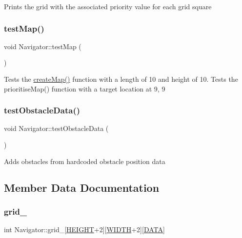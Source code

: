 Prints the grid with the associated priority value for each grid square \mbox{\label{class_navigator_afe98283ec2d1bf0125c63eb077cc1d61}} 
\subsubsection{\texorpdfstring{test\+Map()}{testMap()}}
{\footnotesize\ttfamily void Navigator\+::test\+Map (\begin{DoxyParamCaption}{ }\end{DoxyParamCaption})}

Tests the \mbox{\hyperlink{class_navigator_a8b0cb171e3e3b16b206278fb23f624bc}{create\+Map()}} function with a length of 10 and height of 10. Tests the prioritise\+Map() function with a target location at 9, 9 \mbox{\label{class_navigator_ae31be1ae0d17e7fc78aa7c6a4553fca2}} 
\subsubsection{\texorpdfstring{test\+Obstacle\+Data()}{testObstacleData()}}
{\footnotesize\ttfamily void Navigator\+::test\+Obstacle\+Data (\begin{DoxyParamCaption}{ }\end{DoxyParamCaption})}

Adds obstacles from hardcoded obstacle position data 

\subsection{Member Data Documentation}
\mbox{\label{class_navigator_ad295138915accad1b15031a977f59b3e}} 
\subsubsection{\texorpdfstring{grid\+\_\+}{grid\_}}
{\footnotesize\ttfamily int Navigator\+::grid\+\_\+\mbox{[}\mbox{\hyperlink{_navigator_8h_af728b7647e0b8c49832983a31f9a2e9b}{H\+E\+I\+G\+HT}}+2\mbox{]}\mbox{[}\mbox{\hyperlink{_navigator_8h_a9649ab8139c4c2ea5c93625b30d92a05}{W\+I\+D\+TH}}+2\mbox{]}\mbox{[}\mbox{\hyperlink{_navigator_8h_ace45c8c944a852d4990f5f8f87b2335e}{D\+A\+TA}}\mbox{]}}



